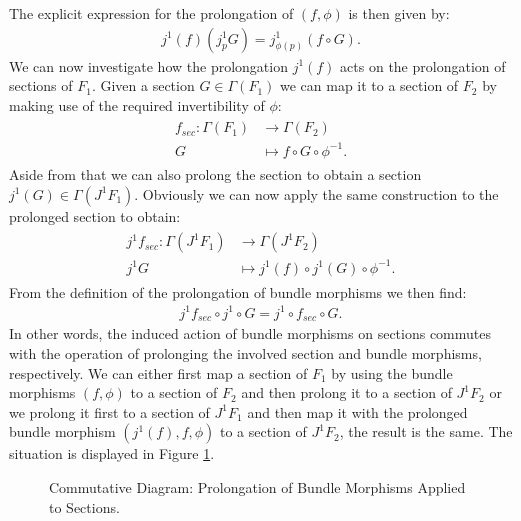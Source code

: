 The explicit expression for the prolongation of $(f,\phi)$ is then given by:
\begin{align}
    j^1(f)(j^1_pG) = j^1_{\phi(p)}(f\circ G).
\end{align}
We can now investigate how the prolongation $j^1(f)$ acts on the prolongation of sections of $F_1$.
Given a section $G \in \Gamma(F_1)$ we can map it to a section of $F_2$ by making use of the required invertibility of $\phi$: 
\begin{align}
\begin{aligned}
f_{sec} : \Gamma(F_1) &\longrightarrow \Gamma(F_2) \\
G & \longmapsto f \circ G \circ \phi^{-1}.
\end{aligned}
\end{align}
Aside from that we can also prolong the section to obtain a section $j^1(G) \in \Gamma(J^1F_1)$. Obviously we can now apply the same construction to the prolonged section to obtain:
\begin{align}
\begin{aligned}
j^1f_{sec}: \Gamma(J^1F_1) &\longrightarrow \Gamma(J^1F_2) \\
j^1G & \longmapsto  j^1(f) \circ j^1(G) \circ \phi^{-1}.
\end{aligned}
\end{align}
From the definition of the prolongation of bundle morphisms we then find:
\begin{align}
    j^1f_{sec} \circ j^1 \circ G = j^1 \circ f_{sec} \circ G.
\end{align}
In other words, the induced action of bundle morphisms on sections commutes with the operation of prolonging the involved section and bundle morphisms, respectively. We can either first map a section of $F_1$ by using the bundle morphisms $(f,\phi)$ to a section of $F_2$ and then prolong it to a section of $J^1F_2$ or we prolong it first to a section of $J^1F_1$ and then map it with the prolonged bundle morphism $(j^1(f),f,\phi)$ to a section of $J^1F_2$, the result is the same. The situation is displayed in Figure \ref{BundleMorphSec}. 

\begin{figure}[hbt!]
\centering 
{}
\caption{Commutative Diagram: Prolongation of Bundle Morphisms Applied to Sections.}\label{BundleMorphSec}
\end{figure}

